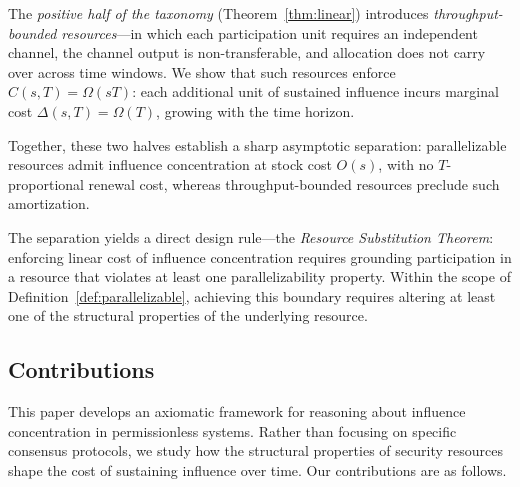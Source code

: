 \documentclass[manuscript,review]{acmart}
\theoremstyle{remark}
\begin{document}
	The \emph{positive half of the taxonomy}
	(Theorem~\ref{thm:linear}) introduces
	\emph{throughput-bounded resources}---in which each
	participation unit requires an independent channel, the
	channel output is non-transferable, and allocation does not
	carry over across time windows. We show that such resources
	enforce $C(s,T)=\Omega(sT)$: each additional unit of
	sustained influence incurs marginal cost
	$\Delta(s,T)=\Omega(T)$, growing with the time horizon.
	
	Together, these two halves establish a sharp asymptotic
	separation: parallelizable resources admit influence
	concentration at stock cost $O(s)$, with no
	$T$-proportional renewal cost, whereas throughput-bounded
	resources preclude such amortization.
	
	The separation yields a direct design rule---the
	\emph{Resource Substitution Theorem}: enforcing linear
	cost of influence concentration requires grounding
	participation in a resource that violates at least one
	parallelizability property. Within the scope of
	Definition~\ref{def:parallelizable}, achieving this
	boundary requires altering at least one of the structural
	properties of the underlying resource.
	
	
	\subsection{Contributions}
	\label{ssec:contributions}
	
	This paper develops an axiomatic framework for reasoning
	about influence concentration in permissionless systems.
	Rather than focusing on specific consensus protocols, we
	study how the structural properties of security resources
	shape the cost of sustaining influence over time. Our
	contributions are as follows.
	
\end{document}
